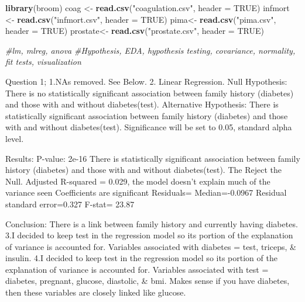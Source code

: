 \documentclass[
]{article}
\newenvironment{Shaded}{\begin{snugshade}}{\end{snugshade}}
\newcommand{\AttributeTok}[1]{\textcolor[rgb]{0.13,0.29,0.53}{#1}}
\newcommand{\CommentTok}[1]{\textcolor[rgb]{0.56,0.35,0.01}{\textit{#1}}}
\newcommand{\ConstantTok}[1]{\textcolor[rgb]{0.56,0.35,0.01}{#1}}
\newcommand{\FunctionTok}[1]{\textcolor[rgb]{0.13,0.29,0.53}{\textbf{#1}}}
\newcommand{\NormalTok}[1]{#1}
\newcommand{\OtherTok}[1]{\textcolor[rgb]{0.56,0.35,0.01}{#1}}
\newcommand{\StringTok}[1]{\textcolor[rgb]{0.31,0.60,0.02}{#1}}
\begin{document}
\begin{Shaded}
\begin{Highlighting}[]
\FunctionTok{library}\NormalTok{(broom)}
\NormalTok{coag }\OtherTok{\textless{}{-}} \FunctionTok{read.csv}\NormalTok{(}\StringTok{"coagulation.csv"}\NormalTok{, }\AttributeTok{header =} \ConstantTok{TRUE}\NormalTok{)}
\NormalTok{infmort }\OtherTok{\textless{}{-}} \FunctionTok{read.csv}\NormalTok{(}\StringTok{"infmort.csv"}\NormalTok{, }\AttributeTok{header =} \ConstantTok{TRUE}\NormalTok{)}
\NormalTok{pima}\OtherTok{\textless{}{-}} \FunctionTok{read.csv}\NormalTok{(}\StringTok{"pima.csv"}\NormalTok{, }\AttributeTok{header =} \ConstantTok{TRUE}\NormalTok{)}
\NormalTok{prostate}\OtherTok{\textless{}{-}} \FunctionTok{read.csv}\NormalTok{(}\StringTok{"prostate.csv"}\NormalTok{, }\AttributeTok{header =} \ConstantTok{TRUE}\NormalTok{)}

\CommentTok{\#lm, mlreg, anova}
\CommentTok{\#Hypothesis, EDA, hypothesis testing, covariance, normality, fit tests, visualization}
\end{Highlighting}
\end{Shaded}

Question 1; 1.NAs removed. See Below. 2. Linear Regression. Null
Hypothesis: There is no statistically significant association between
family history (diabetes) and those with and without diabetes(test).
Alternative Hypothesis: There is statistically significant association
between family history (diabetes) and those with and without
diabetes(test). Significance will be set to 0.05, standard alpha level.

Results: P-value: 2e-16 There is statistically significant association
between family history (diabetes) and those with and without
diabetes(test). The Reject the Null. Adjusted R-squared = 0.029, the
model doesn't explain much of the variance seen Coefficients are
significant Residuals= Median=-0.0967 Residual standard error=0.327
F-stat= 23.87

Conclusion: There is a link between family history and currently having
diabetes. 3.I decided to keep test in the regression model so its
portion of the explanation of variance is accounted for. Variables
associated with diabetes = test, triceps, \& insulin. 4.I decided to
keep test in the regression model so its portion of the explanation of
variance is accounted for. Variables associated with test = diabetes,
pregnant, glucose, diastolic, \& bmi. Makes sense if you have diabetes,
then these variables are closely linked like glucose.
\end{document}
